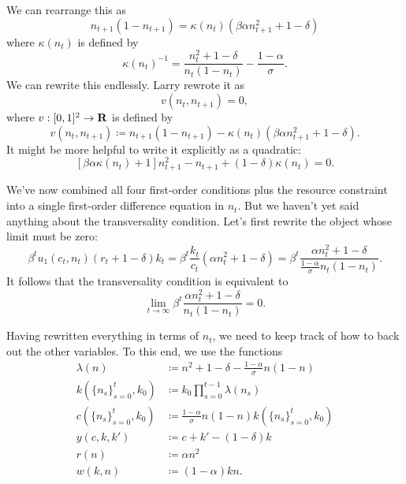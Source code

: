 \documentclass[11pt,letterpaper,reqno,oneside]{article}
\begin{document}
We can rearrange this as
%
\begin{equation*}
	n_{t+1} (1-n_{t+1}) 
	= \kappa(n_t) \left( \beta \alpha n_{t+1}^2 + 1 - \delta \right)
\end{equation*}
%
where $\kappa(n_t)$ is defined by
%
\begin{equation*}
	\kappa(n_t)^{-1} =
	\frac{ n_t^2 + 1 - \delta }{ n_t (1-n_t) } 
	- \frac{1-\alpha}{\sigma} .
\end{equation*}
%
We can rewrite this endlessly. Larry rewrote it as
%
\begin{equation*}
	v(n_t,n_{t+1})=0 , 
\end{equation*}
%
where $v : [0,1]^2 \to \mathbf{R}$ is defined by
%
\begin{equation*}
	v(n_t,n_{t+1}) \coloneqq 
	n_{t+1} (1-n_{t+1}) 
	- \kappa(n_t) \left( \beta \alpha n_{t+1}^2 + 1 - \delta \right) .
\end{equation*}
%
It might be more helpful to write it explicitly as a quadratic:
%
\begin{equation}
	\left[ \beta \alpha \kappa(n_t) + 1 \right] n_{t+1}^2 
	- n_{t+1} 
	+ (1 - \delta)\kappa(n_t)
	= 0 .
	\label{eq:CH99_sufficient}
\end{equation}


We've now combined all four first-order conditions plus the resource constraint into a single first-order difference equation in $n_t$. But we haven't yet said anything about the transversality condition. Let's first rewrite the object whose limit must be zero:
%
\begin{equation*}
	\beta^t u_1(c_t,n_t) (r_t+1-\delta) k_t 
	= \beta^t \frac{k_t}{c_t} \left( \alpha n_t^2 + 1 - \delta \right) 
	= \beta^t \frac{ \alpha n_t^2 + 1 - \delta }
	{ \tfrac{1-\alpha}{\sigma} n_t (1-n_t) } .
\end{equation*}
%
It follows that the transversality condition is equivalent to
%
\begin{equation*}
	\lim_{t\to\infty} \beta^t 
	\frac{ \alpha n_t^2 + 1 - \delta }
	{ n_t (1-n_t) } 
	= 0 .
\end{equation*}


Having rewritten everything in terms of $n_t$, we need to keep track of how to back out the other variables. To this end, we use the functions
%
\begin{align*}
	\lambda(n) 
	&\coloneqq 
	n^2 + 1 - \delta - \tfrac{1-\alpha}{\sigma} n(1-n)
	\\
	k\left(\{n_s\}_{s=0}^t,k_0\right)
	&\coloneqq k_0 \prod_{s=0}^{t-1} \lambda(n_s)
	\\
	c\left(\{n_s\}_{s=0}^t,k_0\right)
	&\coloneqq
	\tfrac{1-\alpha}{\sigma} n (1-n) 
	k\left(\{n_s\}_{s=0}^t,k_0\right)
	\\
	y\left(c,k,k'\right)
	&\coloneqq
	c + k' - (1-\delta) k 
	\\
	r(n)
	&\coloneqq
	\alpha n^2
	\\
	w(k,n)
	&\coloneqq
	(1-\alpha) k n .
\end{align*}
\end{document}
